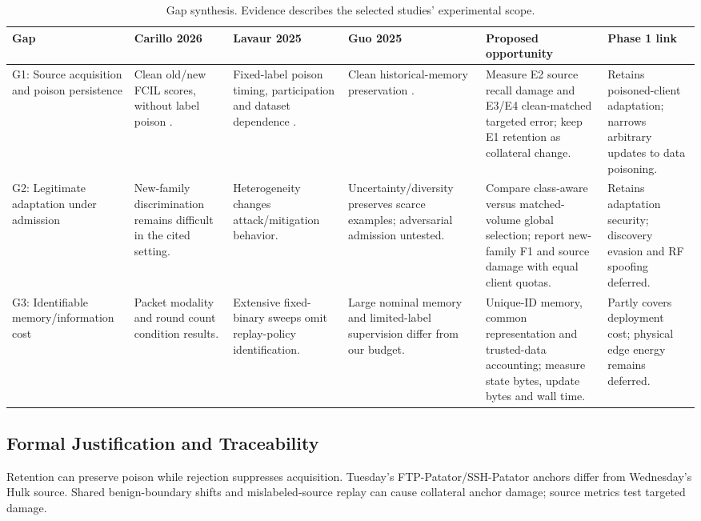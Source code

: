 \documentclass[10pt,a4paper]{article}
\begin{document}
\begin{landscape}
\begin{table}[p]
\centering\footnotesize
\caption{Gap synthesis. Evidence describes the selected studies' experimental scope.}
\label{tab:gaps}
\begin{tabularx}{\linewidth}{L{2.3cm}Y Y Y Y L{2.4cm}}
\toprule
Gap & Carillo 2026 & Lavaur 2025 & Guo 2025 & Proposed opportunity & Phase 1 link\\
\midrule
G1: Source acquisition and poison persistence
& Clean old/new FCIL scores, without label poison \cite{carillo}.
& Fixed-label poison timing, participation and dataset dependence \cite{lavaur}.
& Clean historical-memory preservation \cite{guo}.
& Measure E2 source recall damage and E3/E4 clean-matched targeted error; keep E1 retention as collateral change.
& Retains poisoned-client adaptation; narrows arbitrary updates to data poisoning.\\[5pt]
G2: Legitimate adaptation under admission
& New-family discrimination remains difficult in the cited setting.
& Heterogeneity changes attack/mitigation behavior.
& Uncertainty/diversity preserves scarce examples; adversarial admission untested.
& Compare class-aware versus matched-volume global selection; report new-family F1 and source damage with equal client quotas.
& Retains adaptation security; discovery evasion and RF spoofing deferred.\\[5pt]
G3: Identifiable memory/information cost
& Packet modality and round count condition results.
& Extensive fixed-binary sweeps omit replay-policy identification.
& Large nominal memory and limited-label supervision differ from our budget.
& Unique-ID memory, common representation and trusted-data accounting; measure state bytes, update bytes and wall time.
& Partly covers deployment cost; physical edge energy remains deferred.\\
\bottomrule
\end{tabularx}
\end{table}
\end{landscape}

\subsection{Formal Justification and Traceability}
Retention can preserve poison while rejection suppresses acquisition. Tuesday's FTP-Patator/SSH-Patator anchors differ from Wednesday's Hulk source. Shared benign-boundary shifts and mislabeled-source replay can cause collateral anchor damage; source metrics test targeted damage.
\end{document}
